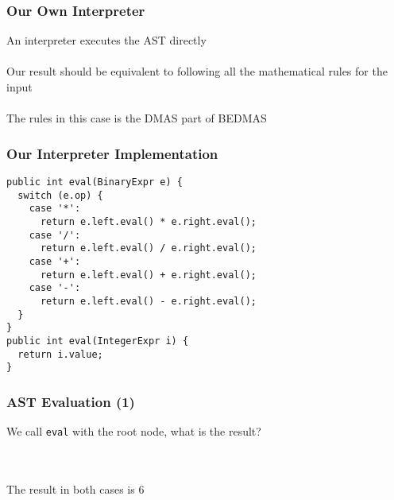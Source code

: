 \documentclass[aspectratio=169]{beamer}
\newenvironment{tikztree}[1][3em]{\begin{center}
\begin{tikzpicture}
  \tikzstyle{every node}=[draw=solarizedAccent, circle,
                           minimum size=#1]}{\end{tikzpicture}
\end{center}}
\begin{document}
\begin{frame}
\frametitle{Our Own Interpreter}

An interpreter executes the AST directly\\~\\

Our result should be equivalent to following all the mathematical rules for
the input\\~\\

The rules in this case is the DMAS part of BEDMAS
\end{frame}

\begin{frame}[fragile]
\frametitle{Our Interpreter Implementation}

\begin{lstlisting}[backgroundcolor=\color{solarizedRebase02}]
public int eval(BinaryExpr e) {
  switch (e.op) {
    case '*':
      return e.left.eval() * e.right.eval();
    case '/':
      return e.left.eval() / e.right.eval();
    case '+':
      return e.left.eval() + e.right.eval();
    case '-':
      return e.left.eval() - e.right.eval();
  }
}
public int eval(IntegerExpr i) {
  return i.value;
}
\end{lstlisting}
\end{frame}

\begin{frame}
\frametitle{AST Evaluation (1)}

We call \lstinline{eval} with the root node, what is the result?

~\\~\\
The result in both cases is 6
\end{frame}
\end{document}
